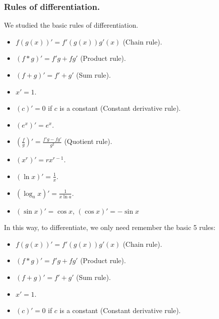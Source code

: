 \begin{frame}
\frametitle{Rules of differentiation.}
We studied the basic rules of differentiation.
\begin{itemize}
\item<1->\alert<14>{ $f (g(x))'=f'(g(x)) g'(x) $ (Chain rule). }
\item<2->\alert<14>{ $(f*g)'=f'g+fg'$ (Product rule).}
\item<3->\alert<14>{ $(f+g)'=f'+g'$ (Sum rule). }
\item<4->\alert<14>{ $x'=1$. }
\item<5->\alert<14>{ $(c)'=0$ if $c$ is a constant (Constant derivative rule).}
\end{itemize}
\begin{itemize}
\item<6->\alert<13>{ $(e^x)'=e^x$.}
\item<7->\alert<13>{ $\left(\frac{f}{g}\right)'=\frac{f' g-f g' }{g^2}$ (Quotient rule).}
\item<8->\alert<13>{ $(x^r)'=rx^{r-1} $.}
\item<9->\alert<13>{ $(\ln x)'=\frac{1}x$.}
\item<10->\alert<13>{ $(\log_a x)'=\frac{1}{x\ln a}$.}
\item<11->\alert<13>{ $(\sin x)'=\cos x$, $(\cos x)'=-\sin x$}
\end{itemize}



\end{frame}
\begin{frame}
In this way, to differentiate, we only need remember the basic 5 rules:
\begin{itemize}
\item{ $f (g(x))'=f'(g(x)) g'(x) $ (Chain rule). }
\item{ $(f*g)'=f'g+fg'$ (Product rule).}
\item{ $(f+g)'=f'+g'$ (Sum rule). }
\item{ $x'=1$. }
\item{ $(c)'=0$ if $c$ is a constant (Constant derivative rule).}
\end{itemize}


\end{frame}
